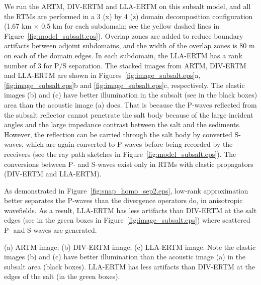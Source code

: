 \documentclass[manuscript,ulem,graphix,revised]{geophysics}
\begin{document}
We run the ARTM, DIV-ERTM and LLA-ERTM on this subsalt model, and all the RTMs are performed in a 3 (x) by 4 (z) domain decomposition configuration (1.67 km $\times$ 0.5 km for each subdomain; see the yellow dashed lines in Figure~\ref{fig:model_subsalt.eps}). Overlap zones are added to reduce boundary artifacts between adjoint subdomains, and the width of the overlap zones is 80 m on each of the domain edges. In each subdomain, the LLA-ERTM has a rank number of 3 for P/S separation.
The stacked images from ARTM, DIV-ERTM and LLA-ERTM are shown in Figures~\ref{fig:image_subsalt.eps}a, \ref{fig:image_subsalt.eps}b and \ref{fig:image_subsalt.eps}c, respectively. The elastic images (b) and (c) have better illumination in the subsalt (see in the black boxes) area than the acoustic image (a) does. That is because the P-waves reflected from the subsalt reflector cannot penetrate the salt body because of the large incident angles and the large impedance contrast between the salt and the sediments. 
However, the reflection can be carried through the salt body by converted S-waves, which are again converted to P-waves before being recorded by the receivers
(see the ray path sketches in Figure~\ref{fig:model_subsalt.eps}). The conversions between P- and S-waves exist only in RTMs with elastic propagators (DIV-ERTM and LLA-ERTM). 

As demonstrated in Figure~\ref{fig:snap_homo_sep2.eps}, low-rank approximation better separates the P-waves than the divergence operators do, in anisotropic wavefields. As a result, LLA-ERTM has less artifacts than DIV-ERTM at the salt edges (see in the green boxes in Figure~\ref{fig:image_subsalt.eps}) where scattered P- and S-waves are generated.

{
\small{(a) ARTM image; (b) DIV-ERTM image; (c) LLA-ERTM image. Note the elastic images (b) and (c) have better illumination than the acoustic image (a) in the subsalt area (black boxes). LLA-ERTM has less artifacts than DIV-ERTM at the edges of the salt (in the green boxes).}
}
\end{document}
